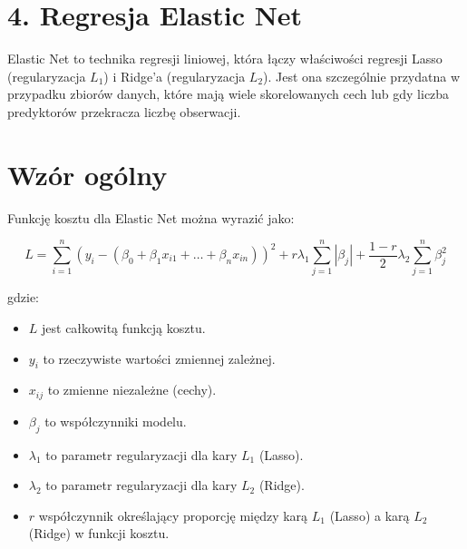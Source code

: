 {}
\justify
\fontsize{14}{16}\selectfont
\setlength{\parindent}{0pt}

\section*{4. Regresja Elastic Net \cite{alma991000280759708832}}
\label{sec:machine_learning_overview}
\fontsize{12}{14}\selectfont
\vspace{-1.0em}

\hspace{1.5cm} Elastic Net to technika regresji liniowej, która łączy właściwości regresji Lasso (regularyzacja $L_1$) i Ridge'a (regularyzacja $L_2$). Jest ona szczególnie przydatna w przypadku zbiorów danych, które mają wiele skorelowanych cech lub gdy liczba predyktorów przekracza liczbę obserwacji.

{}
\section*{Wzór ogólny}
\vspace{-1.0em}
\label{sec:what_is_ml}


Funkcję kosztu dla Elastic Net można wyrazić jako:
\begin{center}
    $$
L = \sum_{i=1}^{n} (y_i - (\beta_0 + \beta_1 x_{i1} + \ldots + \beta_n x_{in}))^2 + r \lambda_1 \sum_{j=1}^{n} |\beta_j| + \frac{1-r}{2}\lambda_2 \sum_{j=1}^{n} \beta_j^2
$$
\end{center}


gdzie:
\begin{itemize}
\setlength\itemsep{-0.5em}
\item $L$ jest całkowitą funkcją kosztu.
\item $y_i$ to rzeczywiste wartości zmiennej zależnej.
 \item  $x_{ij}$ to zmienne niezależne (cechy).
 \item  $\beta_j$ to współczynniki modelu.
 \item  $\lambda_1$ to parametr regularyzacji dla kary $L_1$ (Lasso).
 \item  $\lambda_2$ to parametr regularyzacji dla kary $L_2$ (Ridge).
 \item  $r$ współczynnik określający proporcję między karą $L_1$ (Lasso) a karą $L_2$ (Ridge) w funkcji kosztu.
\end{itemize}
\item 

